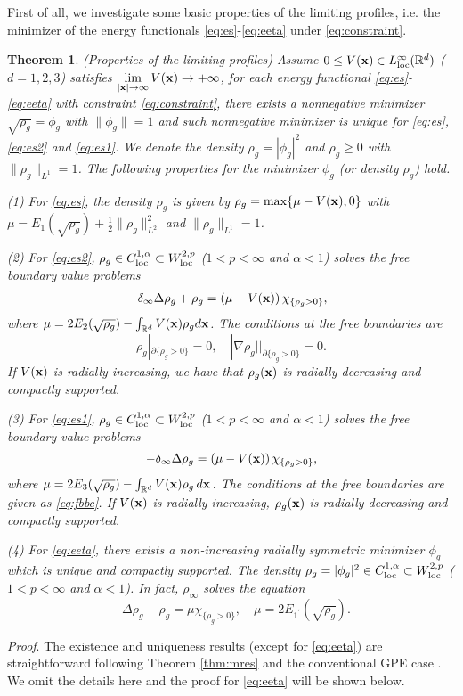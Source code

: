 \documentclass{elsarticle}
\newcommand{\be}{\begin{equation}}
\newcommand{\ee}{\end{equation}}
\newtheorem{theorem}{Theorem}[section]
\newcommand{\bx}{{\bf x} }
\begin{document}
First of all, we investigate some basic properties of the limiting profiles, i.e. the minimizer of the energy functionals \eqref{eq:es}-\eqref{eq:eeta} under \eqref{eq:constraint}.
\begin{theorem}\label{thm:fb}(Properties of the limiting profiles) Assume $0\leq V(\bx)\in L_{\rm loc}^\infty(\Bbb R^d)$  ($d=1,2,3$) satisfies $\lim\limits_{|\bx|\to\infty}V(\bx)\to+\infty$,  for each energy functional \eqref{eq:es}-\eqref{eq:eeta} with constraint \eqref{eq:constraint}, there exists a nonnegative minimizer $\sqrt{\rho_g}=\phi_g$ with $\|\phi_g\|=1$ and such nonnegative minimizer is
unique for \eqref{eq:es}, \eqref{eq:es2} and \eqref{eq:es1}. We denote the density $\rho_g=|\phi_g|^2$ and $\rho_g\ge0$ with $\|\rho_g\|_{L^1}=1$. The following properties for
the minimizer $\phi_g$ (or density $\rho_g$) hold.

(1) For \eqref{eq:es}, the density $\rho_g$  is given by $\rho_g=\max\{\mu-V(\bx),0\}$ with $\mu=E_1(\sqrt{\rho_g})+\frac12\|\rho_g\|_{L^2}^2$ and $\|\rho_g\|_{L^1}=1$.

(2) For \eqref{eq:es2}, $\rho_g\in C_{\rm loc}^{1,\alpha}\subset W_{\rm loc}^{2,p}$ ($1<p<\infty$ and $\alpha<1$) solves the free boundary value problems
\begin{align}\label{eq:fb:1}
&-\delta_\infty\Delta\rho_g+\rho_g=\left(\mu-V(\bx)\right)\chi_{\{\rho_g>0\}},
\end{align}
where $\mu=2E_2(\sqrt{\rho_g})-\int_{\Bbb R^d}V(\bx)\rho_gd\bx$.  The  conditions at the free boundaries are
\be\label{eq:fbbc}
\rho_g|_{\partial\{\rho_g>0\}}=0,\quad |\nabla\rho_g||_{\partial\{\rho_g>0\}}=0.
\ee
If $V(\bx)$ is radially increasing, we have that $\rho_g(\bx)$ is  radially decreasing and compactly supported.

(3) For \eqref{eq:es1},  $\rho_g\in C_{\rm loc}^{1,\alpha}\subset W_{\rm loc}^{2,p}$ ($1<p<\infty$ and $\alpha<1$) solves the free boundary value problems
\be
\label{eq:fb:2}
-\delta_\infty\Delta\rho_g=\left(\mu-V(\bx)\right)\chi_{\{\rho_g>0\}},
\ee
where $\mu=2E_3(\sqrt{\rho_g})-\int_{\Bbb R^d}V(\bx)\rho_g\,d\bx$. The conditions at the free boundaries are given as \eqref{eq:fbbc}. If $V(\bx)$ is radially  increasing, $\rho_g(\bx)$ is  radially decreasing and compactly supported.

(4) For \eqref{eq:eeta},  there exists a non-increasing radially symmetric minimizer $\phi_g$ which is  unique and compactly supported. The density $\rho_g=|\phi_g|^2\in C_{\rm loc}^{1,\alpha}\subset W_{\rm loc}^{2,p}$ ($1<p<\infty$ and $\alpha<1$).
In fact, $\rho_\infty$ solves the equation
\be
-\Delta \rho_g-\rho_g=\mu\chi_{\{\rho_g>0\}},\quad \mu=2E_{1^\prime}(\sqrt{\rho_g}).
\ee
\end{theorem}
 {\noindent\it Proof}. The existence and uniqueness results (except for \eqref{eq:eeta}) are straightforward following Theorem \ref{thm:mres} and the conventional GPE case \cite{Lie,Bao2013}. We omit the details here and the proof for \eqref{eq:eeta} will be shown below.
\end{document}
